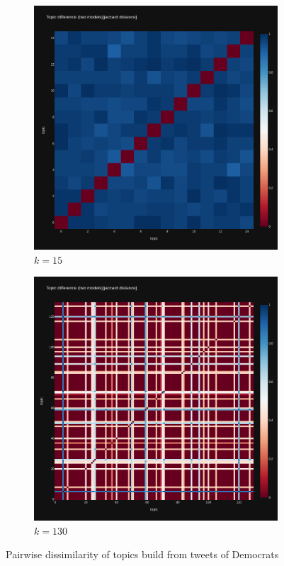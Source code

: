 \documentclass[sigconf, nonacm]{acmart}
\begin{document}
\begin{figure}
	\centering
	\begin{subfigure}[b]{0.45\textwidth}
		\centering
		\includegraphics[width=\textwidth]{figures/dem_dem_diff_15.png}
		\caption{$k=15$}
		\label{fig:k15}
	\end{subfigure}
	\hfill
	\begin{subfigure}[b]{0.45\textwidth}
		\centering
		\includegraphics[width=\textwidth]{figures/dem_dem_diff_130.png}
		\caption{$k=130$}
		\label{fig:k130}
	\end{subfigure}
	\caption{Pairwise dissimilarity of topics build from tweets of Democrats}
	\label{fig:topic-dissim}
\end{figure}
\end{document}
